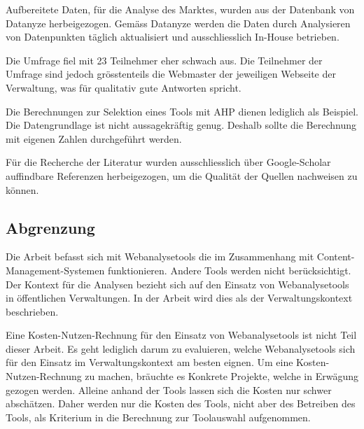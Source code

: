 Aufbereitete Daten, für die Analyse des Marktes, wurden aus der Datenbank von Datanyze \parencite{datanyzeSwitzerlandWebanalytics} herbeigezogen. Gemäss Datanyze \parencite{datanyzeFAQ} werden die Daten durch Analysieren von Datenpunkten täglich aktualisiert und ausschliesslich In-House betrieben.

Die Umfrage fiel mit 23 Teilnehmer eher schwach aus. Die Teilnehmer der Umfrage sind jedoch grösstenteils die Webmaster der jeweiligen Webseite der Verwaltung, was für qualitativ gute Antworten spricht.

Die Berechnungen zur Selektion eines Tools mit AHP dienen lediglich als Beispiel. Die Datengrundlage ist nicht aussagekräftig genug. Deshalb sollte die Berechnung mit eigenen Zahlen durchgeführt werden. 

Für die Recherche der Literatur wurden ausschliesslich über Google-Scholar auffindbare Referenzen herbeigezogen, um die Qualität der Quellen nachweisen zu können.

\subsection{Abgrenzung}
Die Arbeit befasst sich mit Webanalysetools die im Zusammenhang mit Content-Management-Systemen funktionieren. Andere Tools werden nicht berücksichtigt. Der Kontext für die Analysen bezieht sich auf den Einsatz von Webanalysetools in öffentlichen Verwaltungen. In der Arbeit wird dies als der Verwaltungskontext beschrieben. 

Eine Kosten-Nutzen-Rechnung für den Einsatz von Webanalysetools ist nicht Teil dieser Arbeit. Es geht lediglich darum zu evaluieren, welche Webanalysetools sich für den Einsatz im Verwaltungskontext am besten eignen. Um eine Kosten-Nutzen-Rechnung zu machen, bräuchte es Konkrete Projekte, welche in Erwägung gezogen werden. Alleine anhand der Tools lassen sich die Kosten nur schwer abschätzen. Daher werden nur die Kosten des  Tools, nicht aber des Betreiben des Tools, als Kriterium in die Berechnung zur Toolauswahl aufgenommen. 